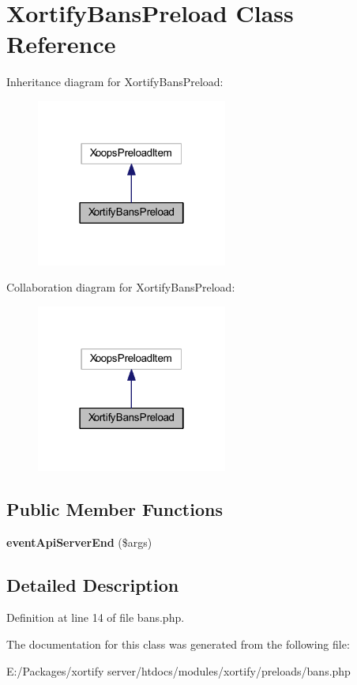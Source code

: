 \hypertarget{class_xortify_bans_preload}{\section{Xortify\-Bans\-Preload Class Reference}
\label{class_xortify_bans_preload}
}


Inheritance diagram for Xortify\-Bans\-Preload\-:
\nopagebreak
\begin{figure}[H]
\begin{center}
\leavevmode
\includegraphics[width=178pt]{class_xortify_bans_preload__inherit__graph}
\end{center}
\end{figure}


Collaboration diagram for Xortify\-Bans\-Preload\-:
\nopagebreak
\begin{figure}[H]
\begin{center}
\leavevmode
\includegraphics[width=178pt]{class_xortify_bans_preload__coll__graph}
\end{center}
\end{figure}
\subsection*{Public Member Functions}
\begin{DoxyCompactItemize}
\item 
\hypertarget{class_xortify_bans_preload_a62e459a2f1d1676b74b93eaa0e01bd02}{{\bfseries event\-Api\-Server\-End} (\$args)}\label{class_xortify_bans_preload_a62e459a2f1d1676b74b93eaa0e01bd02}

\end{DoxyCompactItemize}


\subsection{Detailed Description}


Definition at line 14 of file bans.\-php.



The documentation for this class was generated from the following file\-:\begin{DoxyCompactItemize}
\item 
E\-:/\-Packages/xortify server/htdocs/modules/xortify/preloads/bans.\-php\end{DoxyCompactItemize}
